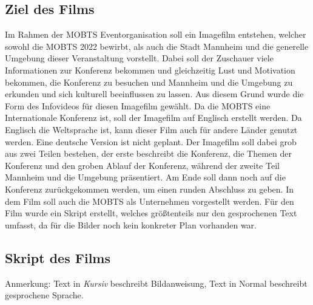 \subsection{Ziel des Films}
Im Rahmen der \ac{MOBTS} Eventorganisation soll ein Imagefilm entstehen, welcher sowohl die \ac{MOBTS} 2022 bewirbt, als auch die Stadt Mannheim und die generelle Umgebung dieser Veranstaltung vorstellt. Dabei soll der Zuschauer viele Informationen zur Konferenz bekommen und gleichzeitig Lust und Motivation bekommen, die Konferenz zu besuchen und Mannheim und die Umgebung zu erkunden und sich kulturell beeinflussen zu lassen. Aus diesem Grund wurde die Form des Infovideos für diesen Imagefilm gewählt. Da die \ac{MOBTS} eine Internationale Konferenz ist, soll der Imagefilm auf Englisch erstellt werden. Da Englisch die Weltsprache ist, kann dieser Film auch für andere Länder genutzt werden. Eine deutsche Version ist nicht geplant. Der Imagefilm soll dabei grob aus zwei Teilen bestehen, der erste beschreibt die Konferenz, die Themen der Konferenz und den groben Ablauf der Konferenz, während der zweite Teil Mannheim und die Umgebung präsentiert. Am Ende soll dann noch auf die Konferenz zurückgekommen werden, um einen runden Abschluss zu geben. In dem Film soll auch die \ac{MOBTS} als Unternehmen vorgestellt werden. Für den Film wurde ein Skript erstellt, welches größtenteils nur den gesprochenen Text umfasst, da für die Bilder noch kein konkreter Plan vorhanden war.
\subsection{Skript des Films}
Anmerkung: Text in \textit{Kursiv} beschreibt Bildanweisung, Text in Normal beschreibt gesprochene Sprache.

